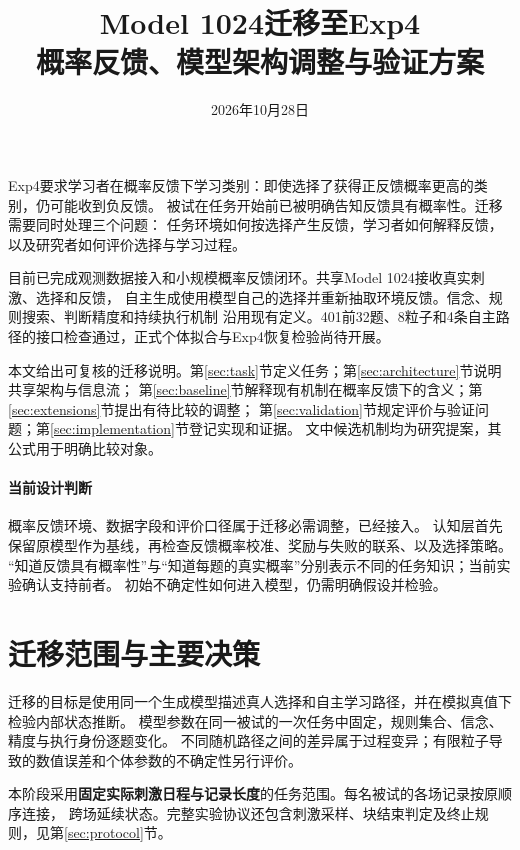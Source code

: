 \documentclass[11pt,a4paper]{article}
\title{Model 1024迁移至Exp4\\[0.5em]
\Large 概率反馈、模型架构调整与验证方案}
\author{}
\date{2026年10月28日}
\numberwithin{equation}{section}
\begin{document}
\maketitle
\thispagestyle{empty}

Exp4要求学习者在概率反馈下学习类别：即使选择了获得正反馈概率更高的类别，仍可能收到负反馈。
被试在任务开始前已被明确告知反馈具有概率性。迁移需要同时处理三个问题：
任务环境如何按选择产生反馈，学习者如何解释反馈，以及研究者如何评价选择与学习过程。

目前已完成观测数据接入和小规模概率反馈闭环。共享Model 1024接收真实刺激、选择和反馈，
自主生成使用模型自己的选择并重新抽取环境反馈。信念、规则搜索、判断精度和持续执行机制
沿用现有定义。401前32题、8粒子和4条自主路径的接口检查通过，正式个体拟合与Exp4恢复检验尚待开展。

本文给出可复核的迁移说明。第\ref{sec:task}节定义任务；第\ref{sec:architecture}节说明共享架构与信息流；
第\ref{sec:baseline}节解释现有机制在概率反馈下的含义；第\ref{sec:extensions}节提出有待比较的调整；
第\ref{sec:validation}节规定评价与验证问题；第\ref{sec:implementation}节登记实现和证据。
文中候选机制均为研究提案，其公式用于明确比较对象。

\paragraph{当前设计判断}
概率反馈环境、数据字段和评价口径属于迁移必需调整，已经接入。
认知层首先保留原模型作为基线，再检查反馈概率校准、奖励与失败的联系、以及选择策略。
“知道反馈具有概率性”与“知道每题的真实概率”分别表示不同的任务知识；当前实验确认支持前者。
初始不确定性如何进入模型，仍需明确假设并检验。

\clearpage
{\small\setlength{\parskip}{0pt}\tableofcontents}
\clearpage

\section{迁移范围与主要决策}
\label{sec:scope}

迁移的目标是使用同一个生成模型描述真人选择和自主学习路径，并在模拟真值下检验内部状态推断。
模型参数在同一被试的一次任务中固定，规则集合、信念、精度与执行身份逐题变化。
不同随机路径之间的差异属于过程变异；有限粒子导致的数值误差和个体参数的不确定性另行评价。

本阶段采用\textbf{固定实际刺激日程与记录长度}的任务范围。每名被试的各场记录按原顺序连接，
跨场延续状态。完整实验协议还包含刺激采样、块结束判定及终止规则，见第\ref{sec:protocol}节。
\end{document}
